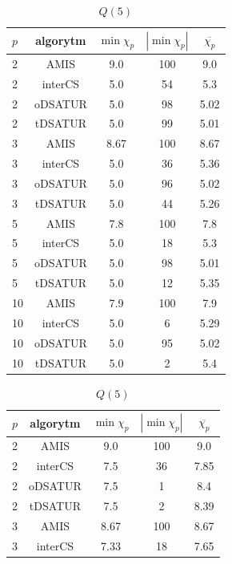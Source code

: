 \documentclass[10pt,a4paper]{article}
\begin{document}
	\begin{table}[H]
		\begin{minipage}{.5\linewidth}
			\centering
			\begin{tabular}{|l|c|c|c|c|}
				\hline
				\textbf{$p$} & \textbf{algorytm} & \textbf{$\min \chi_{p}$} & \textbf{$|\min \chi_{p}|$} & \textbf{$\overline{\chi_{p}}$} \\
				\hline
				2 & AMIS & 9.0 & 100 & 9.0 \\
				2 & interCS & 5.0 & 54 & 5.3 \\
				2 & oDSATUR & 5.0 & 98 & 5.02 \\
				2 & tDSATUR & 5.0 & 99 & 5.01 \\
				\hline
				3 & AMIS & 8.67 & 100 & 8.67 \\
				3 & interCS & 5.0 & 36 & 5.36 \\
				3 & oDSATUR & 5.0 & 96 & 5.02 \\
				3 & tDSATUR & 5.0 & 44 & 5.26 \\
				\hline
				5 & AMIS & 7.8 & 100 & 7.8 \\
				5 & interCS & 5.0 & 18 & 5.3 \\
				5 & oDSATUR & 5.0 & 98 & 5.01 \\
				5 & tDSATUR & 5.0 & 12 & 5.35 \\
				\hline
				10 & AMIS & 7.9 & 100 & 7.9 \\
				10 & interCS & 5.0 & 6 & 5.29 \\
				10 & oDSATUR & 5.0 & 95 & 5.02 \\
				10 & tDSATUR & 5.0 & 2 & 5.4 \\
				\hline
			\end{tabular}
			\caption{$Q(5)$}
		\end{minipage}
		\begin{minipage}{.5\linewidth}
			\centering
			\begin{tabular}{|l|c|c|c|c|}
				\hline
				\textbf{$p$} & \textbf{algorytm} & \textbf{$\min \chi_{p}$} & \textbf{$|\min \chi_{p}|$} & \textbf{$\overline{\chi_{p}}$} \\
				\hline
				2 & AMIS & 9.0 & 100 & 9.0 \\
				2 & interCS & 7.5 & 36 & 7.85 \\
				2 & oDSATUR & 7.5 & 1 & 8.4 \\
				2 & tDSATUR & 7.5 & 2 & 8.39 \\
				\hline
				3 & AMIS & 8.67 & 100 & 8.67 \\
				3 & interCS & 7.33 & 18 & 7.65 \\

\end{tabular}
\end{minipage}
\end{table}
\end{document}
